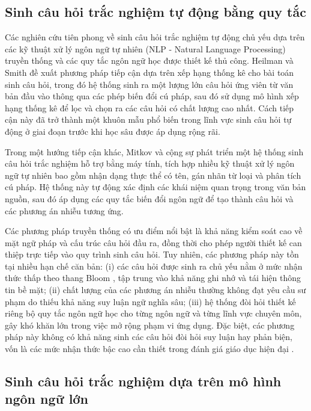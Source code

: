 \subsection{Sinh câu hỏi trắc nghiệm tự động bằng quy tắc}

Các nghiên cứu tiên phong về sinh câu hỏi trắc nghiệm tự động chủ yếu dựa trên các kỹ thuật xử lý ngôn ngữ tự nhiên (NLP - Natural Language Processing) truyền thống và các quy tắc ngôn ngữ học được thiết kế thủ công. Heilman và Smith \cite{heilman2010good} đề xuất phương pháp tiếp cận dựa trên xếp hạng thống kê cho bài toán sinh câu hỏi, trong đó hệ thống sinh ra một lượng lớn câu hỏi ứng viên từ văn bản đầu vào thông qua các phép biến đổi cú pháp, sau đó sử dụng mô hình xếp hạng thống kê để lọc và chọn ra các câu hỏi có chất lượng cao nhất. Cách tiếp cận này đã trở thành một khuôn mẫu phổ biến trong lĩnh vực sinh câu hỏi tự động ở giai đoạn trước khi học sâu được áp dụng rộng rãi.

Trong một hướng tiếp cận khác, Mitkov và cộng sự \cite{mitkov2006computer} phát triển một hệ thống sinh câu hỏi trắc nghiệm hỗ trợ bằng máy tính, tích hợp nhiều kỹ thuật xử lý ngôn ngữ tự nhiên bao gồm nhận dạng thực thể có tên, gán nhãn từ loại và phân tích cú pháp. Hệ thống này tự động xác định các khái niệm quan trọng trong văn bản nguồn, sau đó áp dụng các quy tắc biến đổi ngôn ngữ để tạo thành câu hỏi và các phương án nhiễu tương ứng.

Các phương pháp truyền thống có ưu điểm nổi bật là khả năng kiểm soát cao về mặt ngữ pháp và cấu trúc câu hỏi đầu ra, đồng thời cho phép người thiết kế can thiệp trực tiếp vào quy trình sinh câu hỏi. Tuy nhiên, các phương pháp này tồn tại nhiều hạn chế căn bản: (i) các câu hỏi được sinh ra chủ yếu nằm ở mức nhận thức thấp theo thang Bloom \cite{bloom1956taxonomy}, tập trung vào khả năng ghi nhớ và tái hiện thông tin bề mặt; (ii) chất lượng của các phương án nhiễu thường không đạt yêu cầu sư phạm do thiếu khả năng suy luận ngữ nghĩa sâu; (iii) hệ thống đòi hỏi thiết kế riêng bộ quy tắc ngôn ngữ học cho từng ngôn ngữ và từng lĩnh vực chuyên môn, gây khó khăn lớn trong việc mở rộng phạm vi ứng dụng. Đặc biệt, các phương pháp này không có khả năng sinh các câu hỏi đòi hỏi suy luận hay phản biện, vốn là các mức nhận thức bậc cao cần thiết trong đánh giá giáo dục hiện đại \cite{anderson2001taxonomy}.

\subsection{Sinh câu hỏi trắc nghiệm dựa trên mô hình ngôn ngữ lớn}

